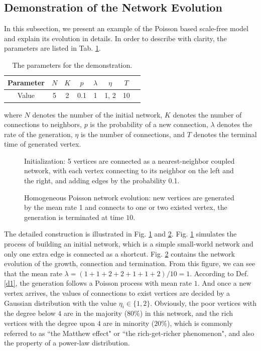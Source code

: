 \documentclass[final]{IEEEtran}
\begin{document}
\subsection{Demonstration of the Network Evolution}

In this subsection, we present an example of the Poisson based
scale-free model and explain its evolution in details. In order to
describe with clarity, the parameters are listed in Tab. \ref{t1}.

\begin{table}[htbp]\tiny
\begin{center}
\caption{\label{t1} The parameters for the demonstration.}
\begin{tabular}{|c|c|c|c|c|c|c|c|}
\hline Parameter & $N$  & $K$   & $p$ & $\lambda$ & $\eta$ & $T$\\
\hline
   Value  & 5  & 2   & 0.1  & 1 &1, 2 & 10\\
\hline
 \end{tabular}
\end{center}
\begin{scriptsize}
where $N$ denotes the number of the initial network, $K$ denotes
the number of connections to neighbors, $p$ is the probability of
a new connection, $\lambda$ denotes the rate of the generation,
$\eta$ is the number of connections, and $T$ denotes the terminal
time of generated vertex.
\end{scriptsize}
\end{table}


\begin{figure}[!htp]
\centering
\caption{\label{f1}Initialization: 5 vertices are connected as a
nearest-neighbor coupled network, with each vertex connecting to
its neighbor on the left and the right, and adding edges by the
probability 0.1.}
\end{figure}
\begin{figure}[!htp]
\centering
\caption{\label{f2}Homogeneous Poisson network evolution: new
vertices are generated by the mean rate 1 and connects to one or
two existed vertex, the generation is terminated at time $10$.}
\end{figure}

The detailed construction is illustrated in Fig. \ref{f1} and
\ref{f2}. Fig. \ref{f1} simulates the process of building an
initial network, which is a simple small-world network and only
one extra edge is connected as a shortcut. Fig. \ref{f2} contains
the network evolution of the growth, connection and termination.
From this figure, we can see that the mean rate
$\lambda=(1+1+2+2+1+1+2)/10=1$. According to Def. \ref{d1}, the
generation follows a Poisson process with mean rate $1$. And once
a new vertex arrives, the values of connections to exist vertices
are decided by a Gaussian distribution with the value
$\eta_{i}\in\{1,2\}$. Obviously, the poor vertices with the degree
below $4$ are in the majority ($80\%$) in this network, and the
rich vertices with the degree upon $4$ are in minority ($20\%$),
which is commonly referred to as ``the Matthew effect" or ``the
rich-get-richer phenomenon", and also the property of a power-law
distribution.
\end{document}
